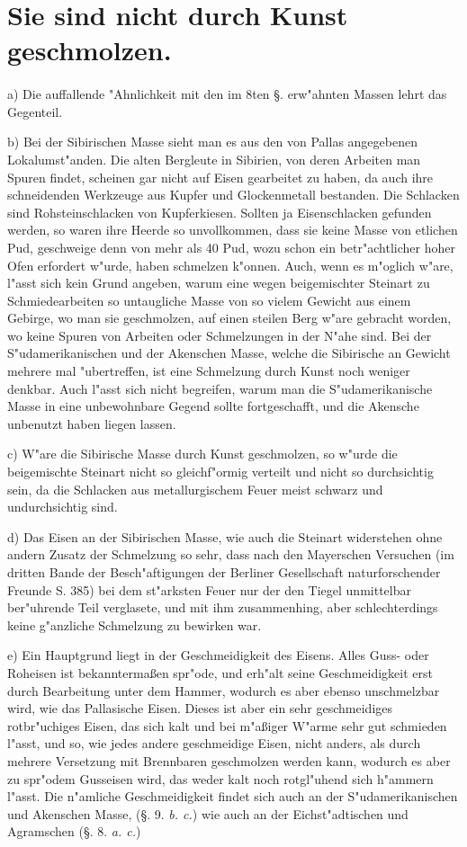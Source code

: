 \documentclass[a4paper, 11pt, oneside, polutonikogreek, german]{article}
\begin{document}
\section{Sie sind nicht durch Kunst geschmolzen.}
\paragraph{}
a) Die auffallende "Ahnlichkeit mit den im 8ten §. erw"ahnten Massen lehrt das Gegenteil.

b) Bei der Sibirischen Masse sieht man es aus den von Pallas angegebenen Lokalumst"anden. Die alten Bergleute in Sibirien, von deren Arbeiten man Spuren findet, scheinen gar nicht auf Eisen gearbeitet zu haben, da auch ihre schneidenden Werkzeuge aus Kupfer und Glockenmetall bestanden. Die Schlacken sind Rohsteinschlacken von Kupferkiesen. Sollten ja Eisenschlacken gefunden werden, so waren ihre Heerde so unvollkommen, dass sie keine Masse von etlichen Pud, geschweige denn von mehr als 40 Pud, wozu schon ein betr"achtlicher hoher Ofen erfordert w"urde, haben schmelzen k"onnen. Auch, wenn es m"oglich w"are, l"asst sich kein Grund angeben, warum eine wegen beigemischter Steinart zu Schmiedearbeiten so untaugliche Masse von so vielem Gewicht aus einem Gebirge, wo man sie geschmolzen, auf einen steilen Berg w"are gebracht worden, wo keine Spuren von Arbeiten oder Schmelzungen in der N"ahe sind. Bei der S"udamerikanischen und der Akenschen Masse, welche die Sibirische an Gewicht mehrere mal "ubertreffen, ist eine Schmelzung durch Kunst noch weniger denkbar. Auch l"asst sich nicht begreifen, warum man die S"udamerikanische Masse in eine unbewohnbare Gegend sollte fortgeschafft, und die Akensche unbenutzt haben liegen lassen.

c) W"are die Sibirische Masse durch Kunst geschmolzen, so w"urde die beigemischte Steinart nicht so gleichf"ormig verteilt und nicht so durchsichtig sein, da die Schlacken aus metallurgischem Feuer meist schwarz und undurchsichtig sind.

d) Das Eisen an der Sibirischen Masse, wie auch die Steinart widerstehen ohne andern Zusatz der Schmelzung so sehr, dass nach den Mayerschen Versuchen (im dritten Bande der Besch"aftigungen der Berliner Gesellschaft naturforschender Freunde S. 385) bei dem st"arksten Feuer nur der den Tiegel unmittelbar ber"uhrende Teil verglasete, und mit ihm zusammenhing, aber schlechterdings keine g"anzliche Schmelzung zu bewirken war.

e) Ein Hauptgrund liegt in der Geschmeidigkeit des Eisens. Alles Guss- oder Roheisen ist bekanntermaßen spr"ode, und erh"alt seine Geschmeidigkeit erst durch Bearbeitung unter dem Hammer, wodurch es aber ebenso unschmelzbar wird, wie das Pallasische Eisen. Dieses ist aber ein sehr geschmeidiges rotbr"uchiges Eisen, das sich kalt und bei m"aßiger W"arme sehr gut schmieden l"asst, und so, wie jedes andere geschmeidige Eisen, nicht anders, als durch mehrere Versetzung mit Brennbaren geschmolzen werden kann, wodurch es aber zu spr"odem Gusseisen wird, das weder kalt noch rotgl"uhend sich h"ammern l"asst. Die n"amliche Geschmeidigkeit findet sich auch an der S"udamerikanischen und Akenschen Masse, (§. 9. \emph{b. c.}) wie auch an der Eichst"adtischen und Agramschen (§. 8. \emph{a. c.})
\end{document}
